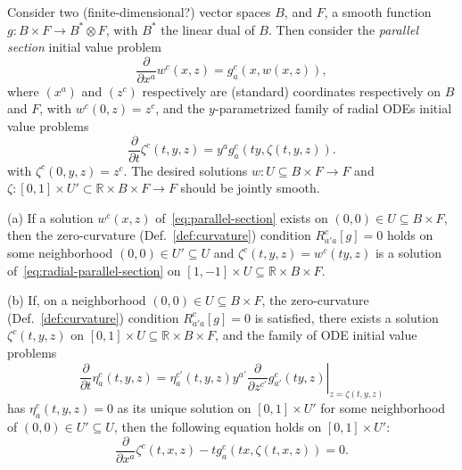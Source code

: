 \begin{lemma} \label{lem:eq-parallel-section}
Consider two (finite-dimensional?) vector spaces $B$, and $F$, a smooth function
$g\colon B \times F \to B^* \otimes F$, with $B^*$ the linear dual of $B$. Then consider
the \emph{parallel section} initial value problem
\begin{equation} \label{eq:parallel-section}
  \frac{\partial}{\partial x^a} w^c(x,z) = g^c_a(x, w(x,z)) ,
\end{equation}
where $(x^a)$ and $(z^c)$ respectively are (standard) coordinates respectively on
$B$ and $F$,
with $w^c(0,z) = z^c$,
and the $y$-parametrized family of radial ODEs initial value problems
\begin{equation} \label{eq:radial-parallel-section}
  \frac{\partial}{\partial t} \zeta^c(t,y,z) = y^a g_a^c(t y, \zeta(t,y,z)) .
\end{equation}
with $\zeta^c(0,y,z) = z^c$. The desired solutions $w\colon U \subseteq B
\times F \to F$ and $\zeta\colon [0,1] \times U' \subset \mathbb{R} \times B
\times F \to F$ should be jointly smooth.

(a) If a solution $w^c(x,z)$ of~\eqref{eq:parallel-section} exists on $(0,0) \in
U \subseteq B\times F$, then the zero-curvature (Def.~\ref{def:curvature})
condition $R_{a'a}^c[g] = 0$ holds on some neighborhood $(0,0) \in U' \subseteq
U$ and $\zeta^c(t,y,z) = w^c(ty, z)$ is a solution
of~\eqref{eq:radial-parallel-section} on $[1,-1]\times U \subseteq \mathbb{R}
\times B \times F$.

(b) If, on a neighborhood $(0,0) \in U \subseteq B \times F$, the zero-curvature
(Def.~\ref{def:curvature}) condition $R_{a'a}^c[g] = 0$ is satisfied, there
exists a solution $\zeta^c(t,y,z)$ on $[0,1] \times U \subseteq \mathbb{R}
\times B \times F$, and the family of ODE initial value problems
\begin{equation} \label{eq:parallel-eq-ode}
  \frac{\partial}{\partial t} \eta_a^c(t,y,z)
  = \left. \eta_a^{c'}(t,y,z) y^{a'} \frac{\partial}{\partial z^{c'}} g_{a'}^c(ty,z) \right|_{z=\zeta(t,y,z)}
\end{equation}
has $\eta_a^c(t,y,z) = 0$ as its unique solution on $[0,1]\times U'$ for some
neighborhood of $(0,0) \in U' \subseteq U$, then the following equation holds on
$[0,1]\times U'$:
\begin{equation} \label{eq:parallel-eq-t}
  \frac{\partial}{\partial x^a} \zeta^c(t,x,z) - t g_a^c(tx, \zeta(t,x,z)) = 0 .
\end{equation}
\end{lemma}

